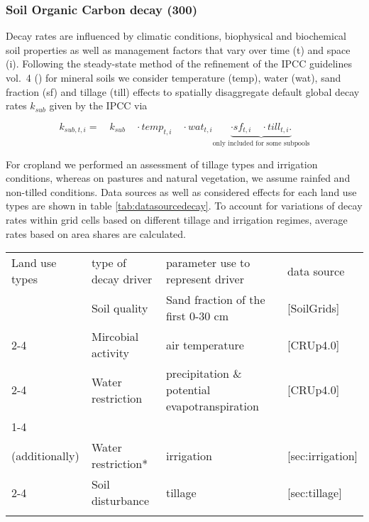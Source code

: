\documentclass[gc, manuscript]{copernicus}
\begin{document}
\hypertarget{sec:tier2}{%
\subsubsection{Soil Organic Carbon decay (300)}\label{sec:tier2}}

Decay rates are influenced by climatic conditions, biophysical and biochemical soil properties as well as management factors that vary over time (t) and space (i). Following the steady-state method of the refinement of the IPCC guidelines vol.~4 (\citet{ipcc_2019_2019}) for mineral soils we consider temperature (temp), water (wat), sand fraction (sf) and tillage (till) effects to spatially disaggregate default global decay rates \(k_{sub}\) given by the IPCC via

\begin{equation}
k_{sub,t,i} = \quad k_{sub} \quad \cdot temp_{t,i} \quad \cdot wat_{t,i} \underbrace{\cdot sf_{t,i} \quad \cdot till_{t,i}.}_{\text{only included for some subpools}}
\label{eq:decayrates}
\end{equation}

For cropland we performed an assessment of tillage types and irrigation conditions, whereas on pastures and natural vegetation, we assume rainfed and non-tilled conditions. Data sources as well as considered effects for each land use types are shown in table \ref{tab:datasourcedecay}. To account for variations of decay rates within grid cells based on different tillage and irrigation regimes, average rates based on area shares are calculated.

 \begin{table*}[h]
 \caption{Type and data sources for carbon inputs to different land use types}
 \begin{tabular}{l l l l}
 \tophline
  Land use types   & type of decay driver & parameter use to represent driver & data source \\
 \middlehline
 \multirow{2}{*}{all} & Soil quality & Sand fraction of the first 0-30 cm &  [SoilGrids]  \\
                      \cline{2-4}
                      
                      & Mircobial activity & air temperature & [CRUp4.0] \\
                      \cline{2-4}
                      
                      & Water restriction & precipitation \& potential evapotranspiration & [CRUp4.0] \\
                      \cline{1-4}
\multirow{2}{*}{\begin{minipage}[t]{0.2\columnwidth}\raggedright\strut Cropland\\(additionally)\strut\end{minipage}} & Water restriction*  & irrigation  & [sec:irrigation] \\ 
                      \cline{2-4}
                      
                      & Soil disturbance & tillage & [sec:tillage] \\
 \bottomhline
 \end{tabular}
 \label{tab:datasourcedecay}
 \belowtable{}
 \end{table*}
\end{document}
